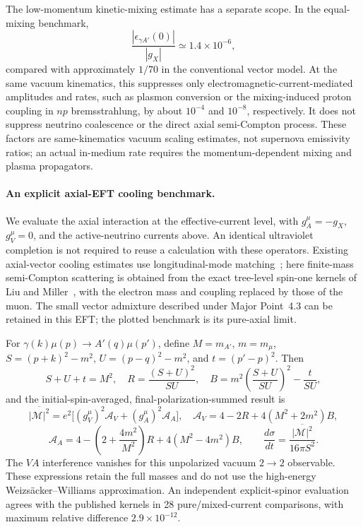 \documentclass[12pt,a4paper]{article}
\begin{document}
\medskip
{}

The low-momentum kinetic-mixing estimate has a separate scope. In the equal-mixing benchmark,
\[
\frac{|\epsilon_{\gamma A'}(0)|}{|g_X|}\simeq1.4\times10^{-6},
\]
compared with approximately \(1/70\) in the conventional vector model. At the same vacuum kinematics, this suppresses only electromagnetic-current-mediated amplitudes and rates, such as plasmon conversion or the mixing-induced proton coupling in \(np\) bremsstrahlung, by about \(10^{-4}\) and \(10^{-8}\), respectively. It does not suppress neutrino coalescence or the direct axial semi-Compton process. These factors are same-kinematics vacuum scaling estimates, not supernova emissivity ratios; an actual in-medium rate requires the momentum-dependent mixing and plasma propagators.

\paragraph{An explicit axial-EFT cooling benchmark.}
We evaluate the axial interaction at the effective-current level, with \(g_A^\mu=-g_X\), \(g_V^\mu=0\), and the active-neutrino currents above. An identical ultraviolet completion is not required to reuse a calculation with these operators. Existing axial-vector cooling estimates use longitudinal-mode matching~\cite{Alonso:2019axial,Gori:2025axial}; here finite-mass semi-Compton scattering is obtained from the exact tree-level spin-one kernels of Liu and Miller~\cite{Liu:2017htz}, with the electron mass and coupling replaced by those of the muon. The small vector admixture described under Major Point~4.3 can be retained in this EFT; the plotted benchmark is its pure-axial limit.

For \(\gamma(k)\mu(p)\to A'(q)\mu(p')\), define \(M=m_{A'}\), \(m=m_\mu\), \(S=(p+k)^2-m^2\), \(U=(p-q)^2-m^2\), and \(t=(p'-p)^2\). Then
\[
S+U+t=M^2,\quad
R=\frac{(S+U)^2}{SU},\quad
B=m^2\left(\frac{S+U}{SU}\right)^2-\frac{t}{SU},
\]
and the initial-spin-averaged, final-polarization-summed result is
\[
\overline{|\mathcal M|^2}=e^2\big[(g_V^\mu)^2\mathcal A_V+
(g_A^\mu)^2\mathcal A_A\big],
\quad
\mathcal A_V=4-2R+4(M^2+2m^2)B,
\]
\[
\mathcal A_A=4-\left(2+\frac{4m^2}{M^2}\right)R
+4(M^2-4m^2)B,\qquad
\frac{d\sigma}{dt}=\frac{\overline{|\mathcal M|^2}}{16\pi S^2}.
\]
The \(VA\) interference vanishes for this unpolarized vacuum \(2\to2\) observable. These expressions retain the full masses and do not use the high-energy Weizs\"acker--Williams approximation. An independent explicit-spinor evaluation agrees with the published kernels in 28 pure/mixed-current comparisons, with maximum relative difference \(2.9\times10^{-12}\).
\end{document}
